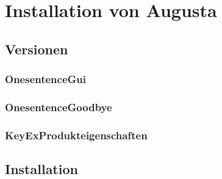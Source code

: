 \chapter{Installation von Augusta}
\label{sec:InstallationAugusta}


\section{Versionen}
\label{Versionen}

\subsection{OnesentenceGui}
\label{sec:OnesentenceGui}


\subsection{OnesentenceGoodbye}
\label{sec:OnesentenceGoodbye}

\subsection{KeyExProdukteigenschaften}
\label{sec:KeyExProdukteigenschaften}

\section{Installation}
\label{sec:Installation}